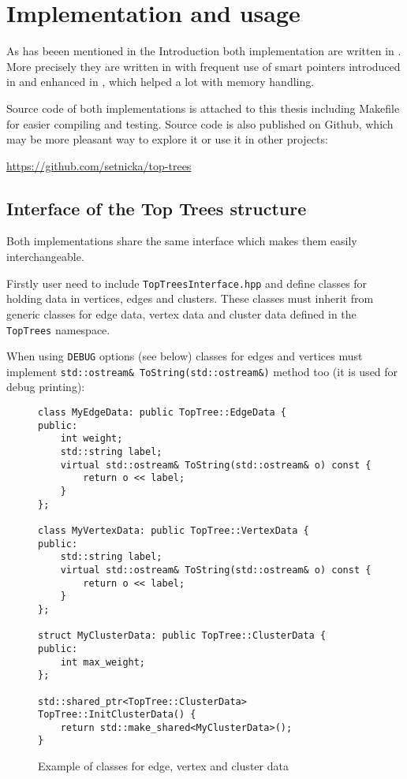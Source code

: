 \chapter{Implementation and usage}
\label{chap:Implementation}

As has beeen mentioned in the Introduction both implementation are written in
\Cpp. More precisely they are written in  with frequent use of smart
pointers introduced in  and enhanced in , which helped a lot with
memory handling.

Source code of both implementations is attached to this thesis including
Makefile for easier compiling and testing. Source code is also published on
Github, which may be more pleasant way to explore it or use it in other
projects:

\bigskip
\centerline{\url{https://github.com/setnicka/top-trees}}
\bigskip

\section{Interface of the Top Trees structure}

Both implementations share the same interface which makes them easily
interchangeable.

Firstly user need to include \texttt{TopTreesInterface.hpp} and define classes
for holding data in vertices, edges and clusters. These classes must inherit
from generic classes for edge data, vertex data and cluster data defined in
the \texttt{TopTrees} namespace.

When using \texttt{DEBUG} options (see below) classes for edges and vertices
must implement \texttt{std::ostream\& ToString(std::ostream\&)} method too (it
is used for debug printing):

\begin{figure}[H]
\begin{verbatim}
class MyEdgeData: public TopTree::EdgeData {
public:
    int weight;
    std::string label;
    virtual std::ostream& ToString(std::ostream& o) const {
        return o << label;
    }
};

class MyVertexData: public TopTree::VertexData {
public:
    std::string label;
    virtual std::ostream& ToString(std::ostream& o) const {
        return o << label;
    }
};

struct MyClusterData: public TopTree::ClusterData {
public:
    int max_weight;
};

std::shared_ptr<TopTree::ClusterData> TopTree::InitClusterData() {
	return std::make_shared<MyClusterData>();
}
\end{verbatim}
\caption{Example of classes for edge, vertex and cluster data}
\end{figure}

